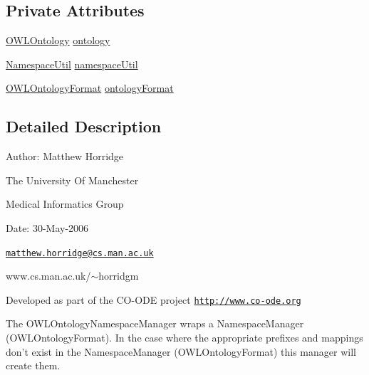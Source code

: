 \subsection*{Private Attributes}
\begin{DoxyCompactItemize}
\item 
\hyperlink{interfaceorg_1_1semanticweb_1_1owlapi_1_1model_1_1_o_w_l_ontology}{O\-W\-L\-Ontology} \hyperlink{classorg_1_1coode_1_1xml_1_1_o_w_l_ontology_x_m_l_namespace_manager_aeb4906fd8488526e3e5dbff9393a0571}{ontology}
\item 
\hyperlink{classorg_1_1semanticweb_1_1owlapi_1_1util_1_1_namespace_util}{Namespace\-Util} \hyperlink{classorg_1_1coode_1_1xml_1_1_o_w_l_ontology_x_m_l_namespace_manager_aa016138872a225903ae385ef6af50b70}{namespace\-Util}
\item 
\hyperlink{classorg_1_1semanticweb_1_1owlapi_1_1model_1_1_o_w_l_ontology_format}{O\-W\-L\-Ontology\-Format} \hyperlink{classorg_1_1coode_1_1xml_1_1_o_w_l_ontology_x_m_l_namespace_manager_ab5c5508d111451a9d2903bf43c197d30}{ontology\-Format}
\end{DoxyCompactItemize}


\subsection{Detailed Description}
Author\-: Matthew Horridge\par
 The University Of Manchester\par
 Medical Informatics Group\par
 Date\-: 30-\/\-May-\/2006\par
\par
 

\href{mailto:matthew.horridge@cs.man.ac.uk}{\tt matthew.\-horridge@cs.\-man.\-ac.\-uk}\par
 www.\-cs.\-man.\-ac.\-uk/$\sim$horridgm\par
\par
 

Developed as part of the C\-O-\/\-O\-D\-E project \href{http://www.co-ode.org}{\tt http\-://www.\-co-\/ode.\-org} 

The O\-W\-L\-Ontology\-Namespace\-Manager wraps a Namespace\-Manager (O\-W\-L\-Ontology\-Format). In the case where the appropriate prefixes and mappings don't exist in the Namespace\-Manager (O\-W\-L\-Ontology\-Format) this manager will create them. 

